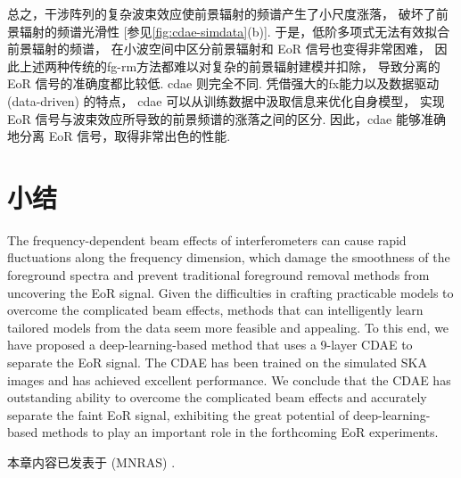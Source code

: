 总之，干涉阵列的复杂波束效应使前景辐射的频谱产生了小尺度涨落，
破坏了前景辐射的频谱光滑性 [参见\autoref{fig:cdae-simdata}(b)].
于是，低阶多项式无法有效拟合前景辐射的频谱，
在小波空间中区分前景辐射和 EoR 信号也变得非常困难，
因此上述两种传统的\ac{fg-rm}方法都难以对复杂的前景辐射建模并扣除，
导致分离的 EoR 信号的准确度都比较低.
\ac{cdae} 则完全不同.
凭借强大的\ac{fx}能力以及数据驱动 (data-driven) 的特点，
\ac{cdae} 可以从训练数据中汲取信息来优化自身模型，
实现 EoR 信号与波束效应所导致的前景频谱的涨落之间的区分.
因此，\ac{cdae} 能够准确地分离 EoR 信号，取得非常出色的性能.


\section{小结}

The frequency-dependent beam effects of interferometers can cause
rapid fluctuations along the frequency dimension,
which damage the smoothness of the foreground spectra and prevent
traditional foreground removal methods from uncovering the EoR signal.
Given the difficulties in crafting practicable models to overcome the
complicated beam effects, methods that can intelligently learn tailored
models from the data seem more feasible and appealing.
To this end, we have proposed a deep-learning-based method that uses
a 9-layer CDAE to separate the EoR signal.
The CDAE has been trained on the simulated SKA images and has achieved
excellent performance.
We conclude that the CDAE has outstanding ability to overcome the
complicated beam effects and accurately separate the faint EoR signal,
exhibiting the great potential of deep-learning-based methods
to play an important role in the forthcoming EoR experiments.

本章内容已发表于 \mnras{} (MNRAS) \cite{li.cdae}.


